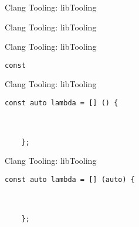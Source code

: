 \begin{slide}{Clang Tooling: libTooling}

  \vspace{0.9cm}


  \vspace{0.7cm}


\end{slide}

\begin{frame}[fragile]{Clang Tooling: libTooling}
\end{frame}

\begin{frame}[fragile]{Clang Tooling: libTooling}
  \begin{lstlisting}[basicstyle=\large\ttfamily]
    const
  \end{lstlisting}
  \vspace{2cm}
\end{frame}

\begin{frame}[fragile]{Clang Tooling: libTooling}
  \begin{lstlisting}[basicstyle=\large\ttfamily]
    const auto lambda = [] () {



    };
  \end{lstlisting}
\end{frame}

\begin{frame}[fragile]{Clang Tooling: libTooling}
  \begin{lstlisting}[basicstyle=\large\ttfamily]
    const auto lambda = [] (auto) {



    };
  \end{lstlisting}
\end{frame}

